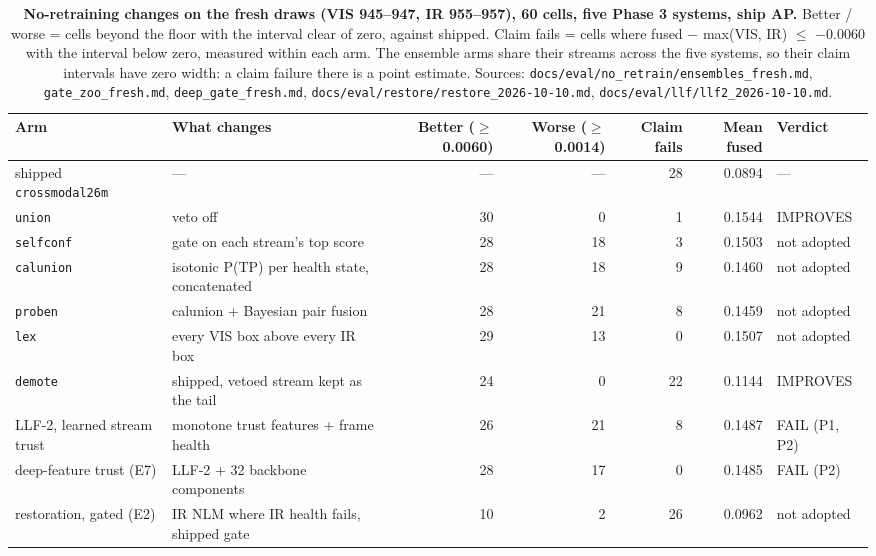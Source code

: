 \documentclass[10pt]{article}
\begin{document}
\begin{table}[htbp]
\centering
\footnotesize
\caption{\textbf{No-retraining changes on the fresh draws (VIS 945--947, IR 955--957), 60 cells, five Phase 3 systems, ship AP.} Better / worse = cells beyond the floor with the interval clear of zero, against shipped. Claim fails = cells where fused $-$ max(VIS, IR) $\leq$ $-$0.0060 with the interval below zero, measured within each arm. The ensemble arms share their streams across the five systems, so their claim intervals have zero width: a claim failure there is a point estimate. Sources: \texttt{docs/\allowbreak{}eval/\allowbreak{}no\_\allowbreak{}retrain/\allowbreak{}ensembles\_\allowbreak{}fresh.md}, \texttt{gate\_\allowbreak{}zoo\_\allowbreak{}fresh.md}, \texttt{deep\_\allowbreak{}gate\_\allowbreak{}fresh.md}, \texttt{docs/\allowbreak{}eval/\allowbreak{}restore/\allowbreak{}restore\_\allowbreak{}2026-10-10.md}, \texttt{docs/\allowbreak{}eval/\allowbreak{}llf/\allowbreak{}llf2\_\allowbreak{}2026-10-10.md}.}
\label{tab:8}
\setlength{\tabcolsep}{3pt}
\begin{tabularx}{\linewidth}{l>{\raggedright\arraybackslash}Xrrrrl}
\toprule
Arm & What changes & Better ($\geq$0.0060) & Worse ($\geq$0.0014) & Claim fails & Mean fused & Verdict \\
\midrule
shipped \texttt{crossmodal26m} & --- & --- & --- & 28 & 0.0894 & --- \\
\texttt{union} & veto off & 30 & 0 & 1 & 0.1544 & IMPROVES \\
\texttt{selfconf} & gate on each stream's top score & 28 & 18 & 3 & 0.1503 & not adopted \\
\texttt{calunion} & isotonic P(TP) per health state, concatenated & 28 & 18 & 9 & 0.1460 & not adopted \\
\texttt{proben} & calunion + Bayesian pair fusion & 28 & 21 & 8 & 0.1459 & not adopted \\
\texttt{lex} & every VIS box above every IR box & 29 & 13 & 0 & 0.1507 & not adopted \\
\texttt{demote} & shipped, vetoed stream kept as the tail & 24 & 0 & 22 & 0.1144 & IMPROVES \\
LLF-2, learned stream trust & monotone trust features + frame health & 26 & 21 & 8 & 0.1487 & FAIL (P1, P2) \\
deep-feature trust (E7) & LLF-2 + 32 backbone components & 28 & 17 & 0 & 0.1485 & FAIL (P2) \\
restoration, gated (E2) & IR NLM where IR health fails, shipped gate & 10 & 2 & 26 & 0.0962 & not adopted \\

\end{tabularx}
\end{table}
\end{document}
